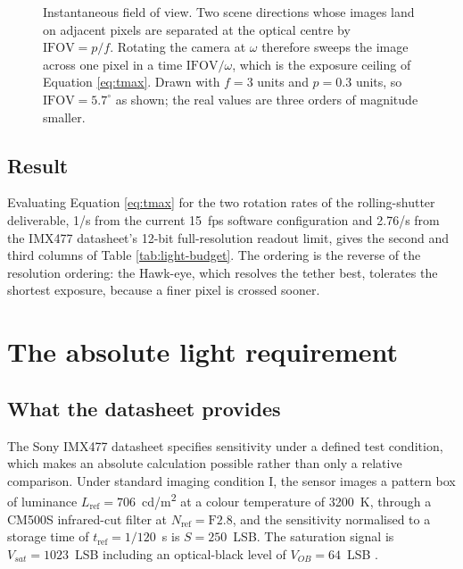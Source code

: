 \begin{figure}[!ht]
\caption[Instantaneous field of view and the origin of the motion-blur limit]{Instantaneous field of view. Two scene directions whose images land on adjacent pixels are separated at the optical centre by $\mathrm{IFOV} = p/f$. Rotating the camera at $\omega$ therefore sweeps the image across one pixel in a time $\mathrm{IFOV}/\omega$, which is the exposure ceiling of Equation \ref{eq:tmax}. Drawn with $f = 3$ units and $p = 0.3$ units, so $\mathrm{IFOV} = 5.7^\circ$ as shown; the real values are three orders of magnitude smaller.}
\label{fig:ifov}
\end{figure}

\subsection{Result}

Evaluating Equation \ref{eq:tmax} for the two rotation rates of the rolling-shutter deliverable, 1\textdegree/s from the current 15~fps software configuration and 2.76\textdegree/s from the IMX477 datasheet's 12-bit full-resolution readout limit, gives the second and third columns of Table \ref{tab:light-budget}. The ordering is the reverse of the resolution ordering: the Hawk-eye, which resolves the tether best, tolerates the shortest exposure, because a finer pixel is crossed sooner.

\section{The absolute light requirement}
\label{sec:light-budget}

\subsection{What the datasheet provides}

The Sony IMX477 datasheet specifies sensitivity under a defined test condition, which makes an absolute calculation possible rather than only a relative comparison. Under standard imaging condition I, the sensor images a pattern box of luminance $L_{\mathrm{ref}} = 706$~cd/m\textsuperscript{2} at a colour temperature of 3200~K, through a CM500S infrared-cut filter at $N_{\mathrm{ref}} = \mathrm{F}2.8$, and the sensitivity normalised to a storage time of $t_{\mathrm{ref}} = 1/120$~s is $S = 250$~LSB. The saturation signal is $V_{sat} = 1023$~LSB including an optical-black level of $V_{OB} = 64$~LSB \cite{sony_imx477_datasheet}.

